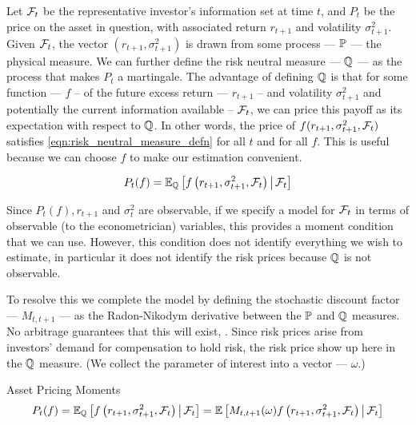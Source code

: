 \documentclass[11pt, letterpaper, twoside, final]{article}
\begin{document}
Let $\mathcal{F}_t$ be the representative investor's information set at time $t$, and $P_t$ be the price on the asset in
question, with associated return $r_{t+1}$ and volatility  $\sigma^2_{t+1}$.
Given $\mathcal{F}_{t}$, the vector $\left( r_{t+1},  \sigma^2_{t+1}\right)$ is drawn from some process --- $\mathbb{P}$ --- the
physical measure. 
We can further define the risk neutral measure --- $\mathbb{Q}$ ---  as the process that makes $P_t$ a martingale.
The advantage of defining $\mathbb{Q}$ is that for some function --- $f$ -- of the future excess return --- $r_{t+1}$  --
and volatility $\sigma^2_{t+1}$ and potentially the current information available -- $\mathcal{F}_t$, we can price this
payoff as its expectation with respect to $\mathbb{Q}$.
In other  words, the price of $f(r_{t+1}, \sigma^2_{t+1}, \mathcal{F}_t)$ satisfies \cref{eqn:risk_neutral_measure_defn}
for all $t$ and for all $f$.  
This is useful because we can choose $f$ to make our estimation convenient.

\begin{equation}
    P_t(f) = \operatorname{\mathbb{E}}_{\mathbb{Q}}\left[ f\left(r_{t+1}, \sigma^2_{t+1}, \mathcal{F}_{t}\right)  \,\middle\vert\, \mathcal{F}_{t}\right]
    \label{eqn:risk_neutral_measure_defn}
\end{equation}

Since $P_t(f), r_{t+1}$ and $\sigma_t^2$ are observable, if we specify a model for $\mathcal{F}_t$ in terms of observable
(to the econometrician) variables, this provides a moment condition that we can use. 
However, this condition does not identify everything we wish to estimate, in particular it does not identify the
risk prices because $\mathbb{Q}$ is not observable.

To resolve this we complete the model by defining the stochastic discount factor --- $M_{t, t+1}$ --- as the
Radon-Nikodym derivative between the $\mathbb{P}$ and $\mathbb{Q}$ measures. 
No arbitrage guarantees that this will exist, \parencite{harrison1978martingales}.
Since risk prices arise from investors' demand for compensation to hold risk, the risk price show up here 
in the $\mathbb{Q}$ measure. 
(We collect the parameter of interest into a vector --- $\omega$.)


\begin{defn}{Asset Pricing Moments}
    \begin{equation}
        P_t(f)  = \operatorname{\mathbb{E}}_{\mathbb{Q}} \left[f\left(r_{t+1}, \sigma^2_{t+1} , \mathcal{F}_t\right) \,\middle\vert\, \mathcal{F}_t \right] =
        \operatorname{\mathbb{E}}\left[M_{t,t+1}(\omega)f\left(r_{t+1}, \sigma^2_{t+1}, \mathcal{F}_t\right) \,\middle\vert\, \mathcal{F}_t \right] 
    \end{equation}
\end{defn}
\end{document}
